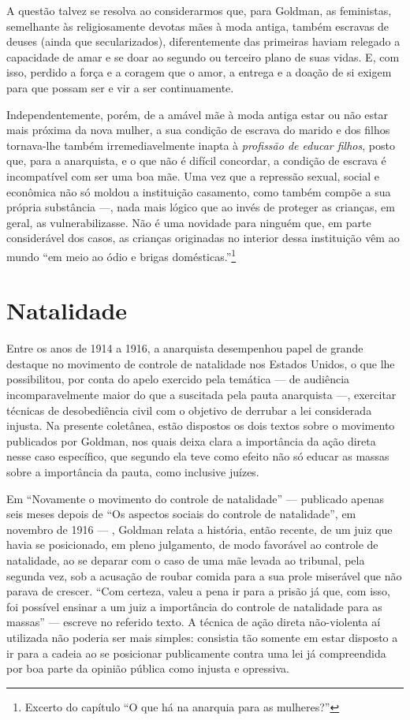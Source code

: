 A questão talvez se resolva ao considerarmos que, para Goldman, as feministas, semelhante às
religiosamente devotas mães à moda antiga, também escravas de deuses (ainda que secularizados), diferentemente das primeiras haviam relegado a capacidade de
amar e se doar ao segundo ou terceiro plano de suas vidas. E, com isso,
perdido a força e a coragem que o amor, a entrega e a
doação de si exigem para que possam ser e vir a ser continuamente.

Independentemente, porém, de a amável mãe à moda antiga estar ou não
estar mais próxima da nova mulher, a sua condição de escrava do marido e
dos filhos tornava-lhe também irremediavelmente inapta à \textit{profissão de
educar filhos}, posto que, para a anarquista, e o que não é difícil
concordar, a condição de escrava é incompatível com ser uma boa mãe.
Uma vez que a repressão sexual, social e econômica não só moldou a
instituição casamento, como também compõe a sua própria substância ---,
nada mais lógico que ao invés de proteger as crianças, em geral, as
vulnerabilizasse. Não é uma novidade para ninguém que, em parte
considerável dos casos, as crianças originadas no interior dessa
instituição vêm ao mundo ``em meio ao ódio e brigas domésticas.''\footnote{Excerto do capítulo ``O
que há na anarquia para as mulheres?''}

\section{Natalidade}

Entre os anos de 1914 a 1916, a anarquista desempenhou papel de grande
destaque no movimento de controle de natalidade nos Estados Unidos, o
que lhe possibilitou, por conta do apelo exercido pela temática --- de
audiência incomparavelmente maior do que a suscitada pela pauta
anarquista ---, exercitar técnicas de desobediência civil com o objetivo
de derrubar a lei considerada injusta. Na presente coletânea, estão
dispostos os dois textos sobre o movimento publicados por Goldman, nos quais deixa clara a importância da ação
direta nesse caso específico, que segundo ela teve como efeito não só
educar as massas sobre a importância da pauta, como inclusive juízes. 

Em
``Novamente o movimento do controle de natalidade'' --- publicado apenas
seis meses depois de ``Os aspectos sociais do controle de natalidade'', em
novembro de 1916 --- , Goldman relata a história, então recente, de um
juiz que havia se posicionado, em pleno julgamento, de modo favorável ao
controle de natalidade, ao se deparar com o caso de uma mãe levada ao
tribunal, pela segunda vez, sob a acusação de roubar comida para a sua
prole miserável que não parava de crescer. ``Com certeza, valeu a pena
ir para a prisão já que, com isso, foi possível ensinar a um juiz a
importância do controle de natalidade para as massas'' --- escreve no
referido texto. A técnica de ação direta não-violenta aí utilizada não
poderia ser mais simples: consistia tão somente em estar disposto a ir
para a cadeia ao se posicionar publicamente contra uma lei já
compreendida por boa parte da opinião pública como injusta e opressiva.

